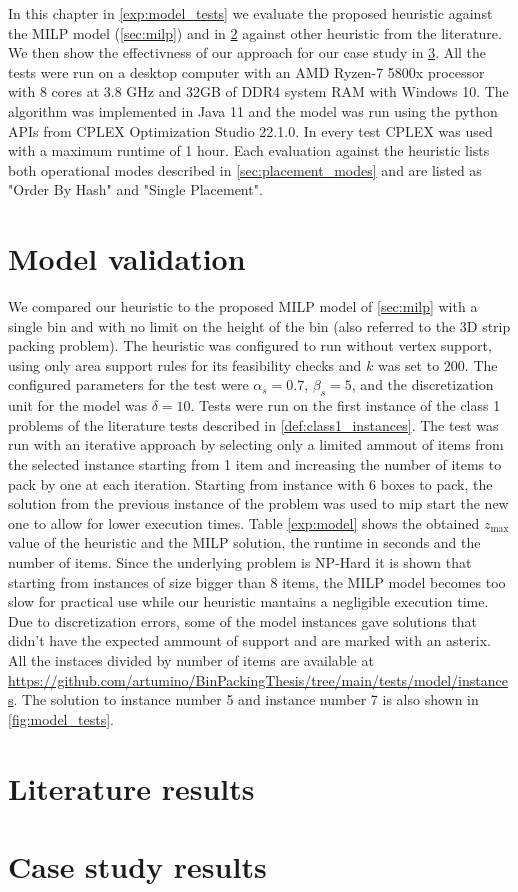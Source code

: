 In this chapter in \cref{exp:model_tests} we evaluate the proposed heuristic against the MILP model (\ref{sec:milp}) and in \cref{exp:literature_tests} against other heuristic from the literature. We then show the effectivness of our approach for our case study in \cref{exp:usecase_results}.
All the tests were run on a desktop computer with an AMD Ryzen-7 5800x processor with 8 cores at 3.8 GHz and 32GB of DDR4 system RAM with Windows 10. The algorithm was implemented in Java 11 and the model was run using the python APIs from CPLEX Optimization Studio 22.1.0.
In every test CPLEX was used with a maximum runtime of 1 hour.
Each evaluation against the heuristic lists both operational modes described in \cref{sec:placement_modes} and are listed as "Order By Hash" and "Single Placement".

\section{Model validation}
We compared our heuristic to the proposed MILP model of \cref{sec:milp} with a single bin and with no limit on the height of the bin (also referred to the 3D strip packing problem).
The heuristic was configured to run without vertex support, using only area support rules for its feasibility checks and $k$ was set to $200$.
The configured parameters for the test were $\alpha_s = 0.7$, $\beta_s = 5$, and the discretization unit for the model was $\delta = 10$. 
Tests were run on the first instance of the class 1 problems of the literature tests described in \cref{def:class1_instances}.
The test was run with an iterative approach by selecting only a limited ammout of items from the selected instance starting from 1 item and increasing the number of items to pack by one at each iteration.
Starting from instance with 6 boxes to pack, the solution from the previous instance of the problem was used to mip start the new one to allow for lower execution times.
Table \ref{exp:model} shows the obtained $z_{\text{max}}$ value of the heuristic and the MILP solution, the runtime in seconds and the number of items.
Since the underlying problem is NP-Hard it is shown that starting from instances of size bigger than 8 items, the MILP model becomes too slow for practical use while our heuristic mantains a negligible execution time.
Due to discretization errors, some of the model instances gave solutions that didn't have the expected ammount of support and are marked with an asterix.
All the instaces divided by number of items are available at \url{https://github.com/artumino/BinPackingThesis/tree/main/tests/model/instances}.
The solution to instance number 5 and instance number 7 is also shown in \cref{fig:model_tests}.
\label{exp:model_tests}



\section{Literature results}
\label{exp:literature_tests}
\label{def:class1_instances}

\section{Case study results}
\label{exp:usecase_results}


